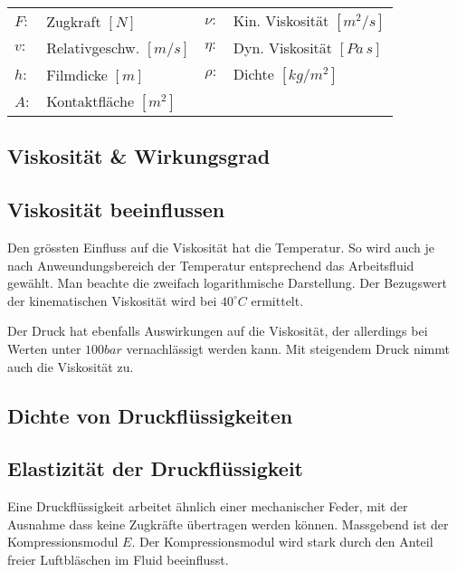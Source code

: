 \begin{tabular}{llll}
$F:$ & Zugkraft $[N]$ & $\nu:$ & Kin. Viskosität $[m^2/s]$ \\
$v:$ & Relativgeschw. $[m/s]$ & $\eta:$ & Dyn. Viskosität $[Pa\,s]$ \\
$h:$ & Filmdicke $[m]$ & $\rho:$ & Dichte $[kg/m^2]$\\
$A:$ & Kontaktfläche $[m^2]$
\end{tabular}


\subsection{Viskosität \& Wirkungsgrad}
\vfill


\subsection{Viskosität beeinflussen}
Den grössten Einfluss auf die Viskosität hat die Temperatur. So wird auch je nach Anweundungsbereich der Temperatur entsprechend das Arbeitsfluid gewählt. 
Man beachte die zweifach logarithmische Darstellung. Der Bezugswert der kinematischen Viskosität wird bei $40^\circ C$ ermittelt.

Der Druck hat ebenfalls Auswirkungen auf die Viskosität, der allerdings bei Werten unter $100 bar$ vernachlässigt werden kann. Mit steigendem Druck nimmt auch die Viskosität zu. 
\vfill

\subsection{Dichte von Druckflüssigkeiten}



\vfill
\columnbreak
\subsection{Elastizität der Druckflüssigkeit}
Eine Druckflüssigkeit arbeitet ähnlich einer mechanischer Feder, mit der Ausnahme dass keine Zugkräfte übertragen werden können. Massgebend ist der Kompressionsmodul $E$. Der Kompressionsmodul wird stark durch den Anteil freier Luftbläschen im Fluid beeinflusst. 


